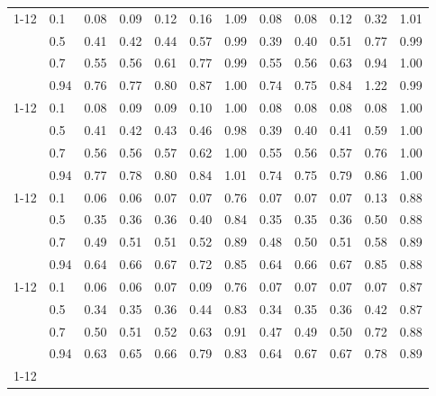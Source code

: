 \begin{table}
{\begin{tabular}{llrrrrrrrrrr}
\cmidrule{1-12}
\multirow[t]{4}{*}{systemd containment removed} & 0.1 & 0.08 & 0.09 & 0.12 & 0.16 & 1.09 & 0.08 & 0.08 & 0.12 & 0.32 & 1.01 \\
 & 0.5 & 0.41 & 0.42 & 0.44 & 0.57 & 0.99 & 0.39 & 0.40 & 0.51 & 0.77 & 0.99 \\
 & 0.7 & 0.55 & 0.56 & 0.61 & 0.77 & 0.99 & 0.55 & 0.56 & 0.63 & 0.94 & 1.00 \\
 & 0.94 & 0.76 & 0.77 & 0.80 & 0.87 & 1.00 & 0.74 & 0.75 & 0.84 & 1.22 & 0.99 \\
\cmidrule{1-12}
\multirow[t]{4}{*}{IRQ steering removed} & 0.1 & 0.08 & 0.09 & 0.09 & 0.10 & 1.00 & 0.08 & 0.08 & 0.08 & 0.08 & 1.00 \\
 & 0.5 & 0.41 & 0.42 & 0.43 & 0.46 & 0.98 & 0.39 & 0.40 & 0.41 & 0.59 & 1.00 \\
 & 0.7 & 0.56 & 0.56 & 0.57 & 0.62 & 1.00 & 0.55 & 0.56 & 0.57 & 0.76 & 1.00 \\
 & 0.94 & 0.77 & 0.78 & 0.80 & 0.84 & 1.01 & 0.74 & 0.75 & 0.79 & 0.86 & 1.00 \\
\cmidrule{1-12}
\multirow[t]{4}{*}{boot-params bundle removed} & 0.1 & 0.06 & 0.06 & 0.07 & 0.07 & 0.76 & 0.07 & 0.07 & 0.07 & 0.13 & 0.88 \\
 & 0.5 & 0.35 & 0.36 & 0.36 & 0.40 & 0.84 & 0.35 & 0.35 & 0.36 & 0.50 & 0.88 \\
 & 0.7 & 0.49 & 0.51 & 0.51 & 0.52 & 0.89 & 0.48 & 0.50 & 0.51 & 0.58 & 0.89 \\
 & 0.94 & 0.64 & 0.66 & 0.67 & 0.72 & 0.85 & 0.64 & 0.66 & 0.67 & 0.85 & 0.88 \\
\cmidrule{1-12}
\multirow[t]{4}{*}{frequency pinning removed} & 0.1 & 0.06 & 0.06 & 0.07 & 0.09 & 0.76 & 0.07 & 0.07 & 0.07 & 0.07 & 0.87 \\
 & 0.5 & 0.34 & 0.35 & 0.36 & 0.44 & 0.83 & 0.34 & 0.35 & 0.36 & 0.42 & 0.87 \\
 & 0.7 & 0.50 & 0.51 & 0.52 & 0.63 & 0.91 & 0.47 & 0.49 & 0.50 & 0.72 & 0.88 \\
 & 0.94 & 0.63 & 0.65 & 0.66 & 0.79 & 0.83 & 0.64 & 0.67 & 0.67 & 0.78 & 0.89 \\
\cmidrule{1-12}
\bottomrule
\end{tabular}%
}
\end{table}
